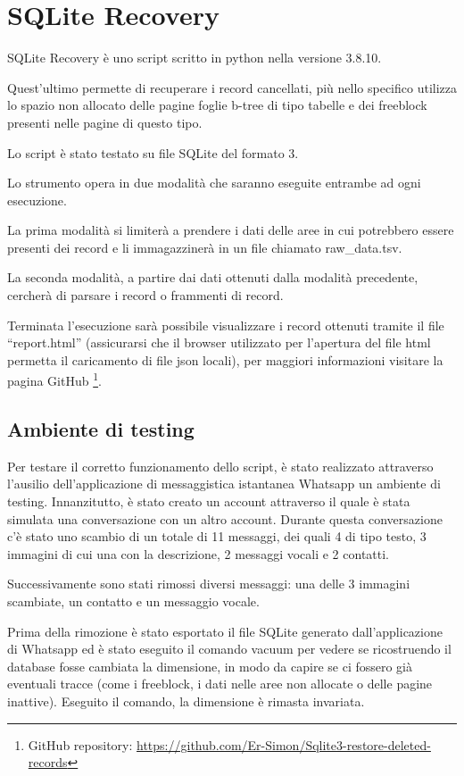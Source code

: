
\chapter{SQLite Recovery}
SQLite Recovery è uno script scritto in python nella versione 3.8.10.  

Quest'ultimo permette di recuperare i record cancellati, più nello specifico utilizza lo spazio non allocato delle pagine foglie b-tree di tipo tabelle e dei freeblock presenti nelle pagine di questo tipo.

Lo script è stato testato su file SQLite del formato 3.

Lo strumento opera in due modalità che saranno eseguite entrambe ad ogni esecuzione.

La prima modalità si limiterà a prendere i dati delle aree in cui potrebbero essere presenti dei record e li immagazzinerà in un file chiamato raw\string_data.tsv.

La seconda modalità, a partire dai dati ottenuti dalla modalità precedente, cercherà di parsare i record o frammenti di record.

Terminata l’esecuzione sarà possibile visualizzare i record ottenuti tramite il file “report.html” (assicurarsi che il browser utilizzato per l’apertura del file html permetta il caricamento di file json locali), per maggiori informazioni visitare la pagina GitHub \footnote{GitHub repository: \url{https://github.com/Er-Simon/Sqlite3-restore-deleted-records}}.


\section{Ambiente di testing}
Per testare il corretto funzionamento dello script, è stato realizzato attraverso l'ausilio dell'applicazione di messaggistica istantanea Whatsapp un ambiente di testing. Innanzitutto, è stato creato un account attraverso il quale è stata simulata una conversazione con un altro account. Durante questa conversazione c'è stato uno scambio di un totale di 11 messaggi, dei quali 4 di tipo testo, 3 immagini di cui una con la descrizione, 2 messaggi vocali e 2 contatti.

Successivamente sono stati rimossi diversi messaggi: una delle 3 immagini scambiate, un contatto e un messaggio vocale.

Prima della rimozione è stato esportato il file SQLite generato dall'applicazione di Whatsapp ed è stato eseguito il comando vacuum per vedere se ricostruendo il database fosse cambiata la dimensione, in modo da capire se ci fossero già eventuali tracce (come i freeblock, i dati nelle aree non allocate o delle pagine inattive). Eseguito il comando, la dimensione è rimasta invariata.

